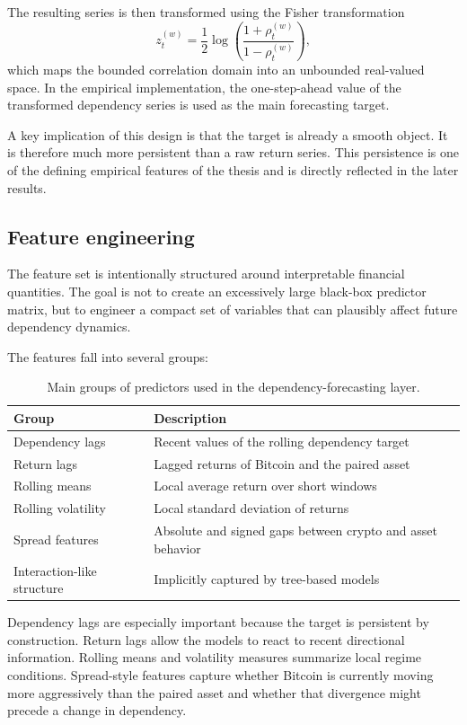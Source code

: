 The resulting series is then transformed using the Fisher transformation
\[
z_t^{(w)} = \frac{1}{2}\log\left(\frac{1 + \rho_t^{(w)}}{1 - \rho_t^{(w)}}\right),
\]
which maps the bounded correlation domain into an unbounded real-valued space. In the empirical implementation, the one-step-ahead value of the transformed dependency series is used as the main forecasting target.

A key implication of this design is that the target is already a smooth object. It is therefore much more persistent than a raw return series. This persistence is one of the defining empirical features of the thesis and is directly reflected in the later results.

\subsection{Feature engineering}

The feature set is intentionally structured around interpretable financial quantities. The goal is not to create an excessively large black-box predictor matrix, but to engineer a compact set of variables that can plausibly affect future dependency dynamics.

The features fall into several groups:

\begin{table}[H]
    \centering
    \caption{Main groups of predictors used in the dependency-forecasting layer.}
    \label{tab:feature_groups}
    \begin{tabular}{ll}
        \toprule
        Group & Description \\
        \midrule
        Dependency lags & Recent values of the rolling dependency target \\
        Return lags & Lagged returns of Bitcoin and the paired asset \\
        Rolling means & Local average return over short windows \\
        Rolling volatility & Local standard deviation of returns \\
        Spread features & Absolute and signed gaps between crypto and asset behavior \\
        Interaction-like structure & Implicitly captured by tree-based models \\
        \bottomrule
    \end{tabular}
\end{table}

Dependency lags are especially important because the target is persistent by construction. Return lags allow the models to react to recent directional information. Rolling means and volatility measures summarize local regime conditions. Spread-style features capture whether Bitcoin is currently moving more aggressively than the paired asset and whether that divergence might precede a change in dependency.

